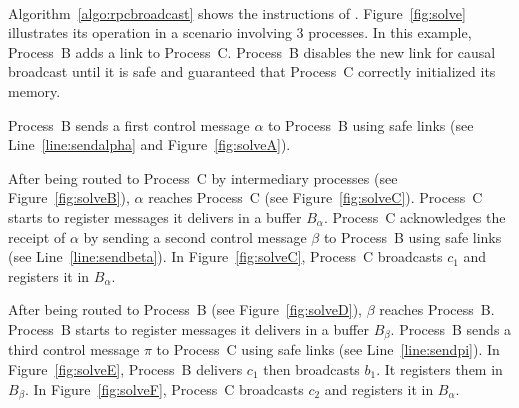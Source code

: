 \begin{figure*}
\begin{center}
    {}
    \hspace{30pt}
    \\
    \caption{\label{fig:solve}Using buffers and control messages, \RPCBROADCAST 
      provides reliable causal broadcast.}
  \end{center}
\end{figure*}

\begin{algorithm*}[h]
  
  \caption{\label{algo:rpcbroadcast}\RPCBROADCAST at Process $p$.}
\end{algorithm*}


Algorithm~\ref{algo:rpcbroadcast} shows the instructions of \RPCBROADCAST. 
Figure~\ref{fig:solve} illustrates its operation in a scenario involving 3
processes. In this example, Process~B adds a link to Process~C. Process~B
disables the new link for causal broadcast until it is safe and guaranteed that
Process~C correctly initialized its memory.

\noindent Process~B sends a first control message $\alpha$ to Process~B using
safe links (see Line~\ref{line:sendalpha} and Figure~\ref{fig:solveA}).

\noindent After being routed to Process~C by intermediary processes (see
Figure~\ref{fig:solveB}), $\alpha$ reaches Process~C (see
Figure~\ref{fig:solveC}).  Process~C starts to register messages it delivers in
a buffer $B_\alpha$.  Process~C acknowledges the receipt of $\alpha$ by sending
a second control message $\beta$ to Process~B using safe links (see
Line~\ref{line:sendbeta}). In Figure~\ref{fig:solveC}, Process~C broadcasts
$c_1$ and registers it in $B_\alpha$.

\noindent After being routed to Process~B (see Figure~\ref{fig:solveD}), $\beta$
reaches Process~B. Process~B starts to register messages it delivers in a buffer
$B_\beta$. Process~B sends a third control message $\pi$ to Process~C using safe
links (see Line~\ref{line:sendpi}). In Figure~\ref{fig:solveE}, Process~B delivers
$c_1$ then broadcasts $b_1$. It registers them in $B_\beta$. In Figure~\ref{fig:solveF},
Process~C broadcasts $c_2$ and registers it in $B_\alpha$.

